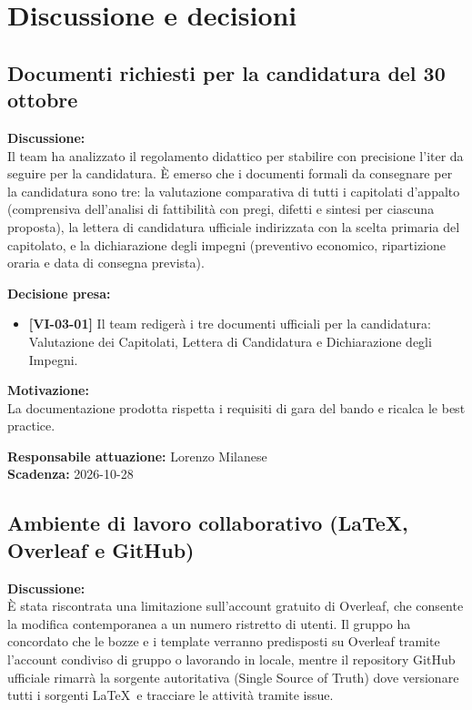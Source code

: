 \documentclass[12pt,a4paper]{article}
\newcommand{\tightlist}{\setlength{\itemsep}{1pt}\setlength{\parskip}{0pt}}
\begin{document}
\hypertarget{discussione-e-decisioni}{%
\section{Discussione e decisioni}}

\hypertarget{argomento-1}{%
\subsection{Documenti richiesti per la candidatura del 30 ottobre}}

\textbf{Discussione:} \\
Il team ha analizzato il regolamento didattico per stabilire con precisione l'iter da seguire per la candidatura. È emerso che i documenti formali da consegnare per la candidatura sono tre: la valutazione comparativa di tutti i capitolati d'appalto (comprensiva dell'analisi di fattibilità con pregi, difetti e sintesi per ciascuna proposta), la lettera di candidatura ufficiale indirizzata con la scelta primaria del capitolato, e la dichiarazione degli impegni (preventivo economico, ripartizione oraria e data di consegna prevista).

\textbf{Decisione presa:}
\begin{itemize}
\tightlist
\item[$\checkmark$] \textbf{[VI-03-01]} Il team redigerà i tre documenti ufficiali per la candidatura: Valutazione dei Capitolati, Lettera di Candidatura e Dichiarazione degli Impegni.
\end{itemize}

\textbf{Motivazione:} \\
La documentazione prodotta rispetta i requisiti di gara del bando e ricalca le best practice.

\textbf{Responsabile attuazione:} Lorenzo Milanese \\
\textbf{Scadenza:} 2026-10-28

\hypertarget{argomento-2}{%
\subsection{Ambiente di lavoro collaborativo (\LaTeX, Overleaf e GitHub)}}

\textbf{Discussione:} \\
È stata riscontrata una limitazione sull'account gratuito di Overleaf, che consente la modifica contemporanea a un numero ristretto di utenti. Il gruppo ha concordato che le bozze e i template verranno predisposti su Overleaf tramite l'account condiviso di gruppo o lavorando in locale, mentre il repository GitHub ufficiale rimarrà la sorgente autoritativa (Single Source of Truth) dove versionare tutti i sorgenti \LaTeX\ e tracciare le attività tramite issue.
\end{document}

